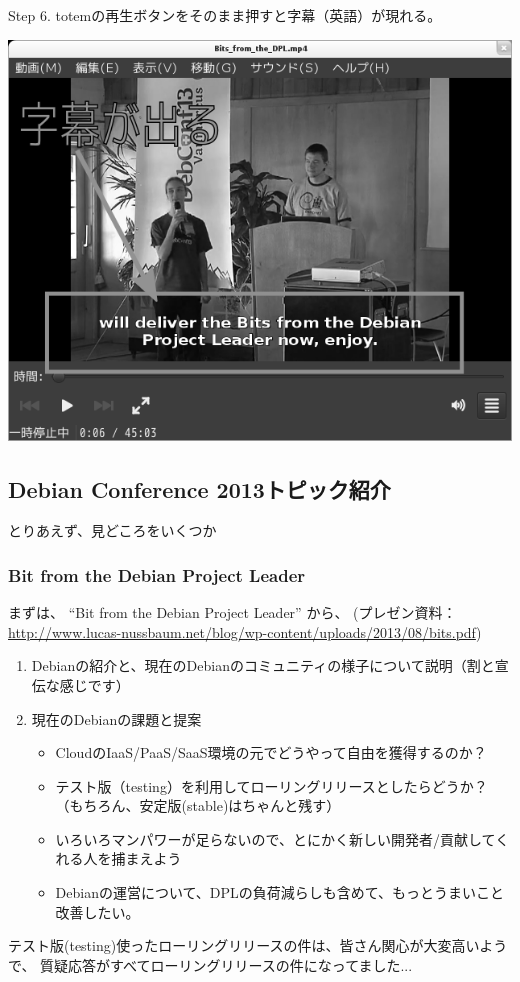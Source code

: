 \documentclass[mingoth,a4paper]{jsarticle}
\begin{document}
Step 6. totemの再生ボタンをそのまま押すと字幕（英語）が現れる。
\begin{center}
\includegraphics[width=0.5\hsize]{image201310/totem-subtitle_mono.png}
\end{center}

\subsection{Debian Conference 2013トピック紹介}
とりあえず、見どころをいくつか

\subsubsection{Bit from the Debian Project Leader}

 まずは、 ``Bit from the Debian Project Leader'' から、
(プレゼン資料：\url{http://www.lucas-nussbaum.net/blog/wp-content/uploads/2013/08/bits.pdf})
\begin{enumerate}
\item Debianの紹介と、現在のDebianのコミュニティの様子について説明（割と宣伝な感じです）
\item 現在のDebianの課題と提案
\begin{itemize}
  \item CloudのIaaS/PaaS/SaaS環境の元でどうやって自由を獲得するのか？
  \item テスト版（testing）を利用してローリングリリースとしたらどうか？（もちろん、安定版(stable)はちゃんと残す）
  \item いろいろマンパワーが足らないので、とにかく新しい開発者/貢献してくれる人を捕まえよう
　\item Debianの運営について、DPLの負荷減らしも含めて、もっとうまいこと改善したい。
\end{itemize}
\end{enumerate}

テスト版(testing)使ったローリングリリースの件は、皆さん関心が大変高いようで、
質疑応答がすべてローリングリリースの件になってました...
\end{document}
